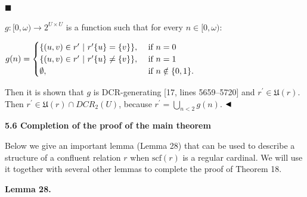  
 
\par\noindent  $\blacksquare$ 
 
$g:[0,\omega)\to 2^{U\times U}$ is a function such that for every $n\in[0,\omega)$:\par
 
 
 
$g(n)=\begin{cases}\{(u,v)\in r^{\prime}\leavevmode\nobreak\ |\leavevmode%
\nobreak\ r^{\prime}\{u\}=\{v\}\},&\text{ if }n=0\\
\{(u,v)\in r^{\prime}\leavevmode\nobreak\ |\leavevmode\nobreak\ r^{\prime}\{u%
\}\neq\{v\}\},&\text{ if }n=1\\
\emptyset,&\text{ if }n\notin\{0,1\}.\\
\end{cases}$\par
 
 
  
 
 
Then it is shown that $g$ is DCR-generating [17, lines 5659–5720] and $r^{\prime}\in\mathfrak{U}(r)$. Then $r^{\prime}\in\mathfrak{U}(r)\cap DCR_{2}(U)$, because $r^{\prime}=\bigcup_{n<2}g(n)$. $\hfill\blacktriangleleft$\par
 
 
 
 
 
\par\medskip\noindent\textbf{5.6 Completion of the proof of the main theorem}\par
 
 
Below we give an important lemma (Lemma 28) that can be used to describe a structure of a confluent relation $r$ when $\mathrm{scf}(r)$ is a regular cardinal. We will use it together with several other lemmas to complete the proof of Theorem 18.\par
 
 
 
\par\medskip\noindent\textbf{Lemma 28.}\par
 

